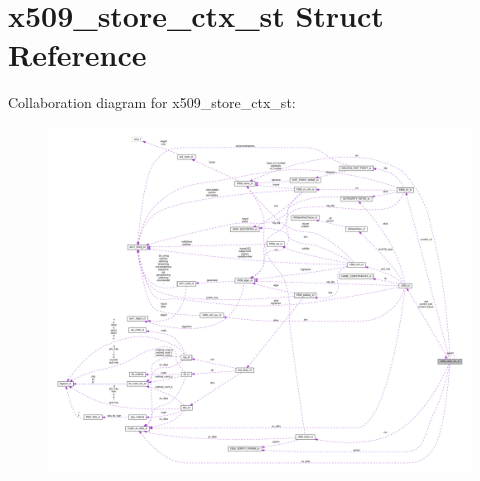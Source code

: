 \hypertarget{structx509__store__ctx__st}{}\section{x509\+\_\+store\+\_\+ctx\+\_\+st Struct Reference}
\label{structx509__store__ctx__st}


Collaboration diagram for x509\+\_\+store\+\_\+ctx\+\_\+st\+:
\nopagebreak
\begin{figure}[H]
\begin{center}
\leavevmode
\includegraphics[width=350pt]{structx509__store__ctx__st__coll__graph}
\end{center}
\end{figure}
